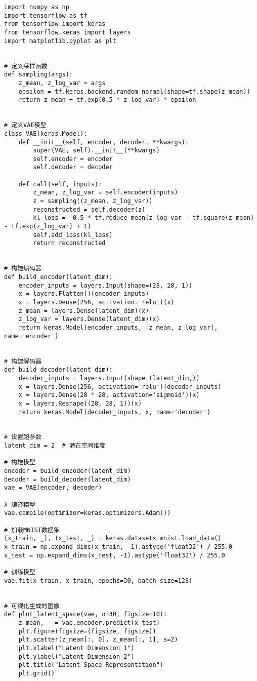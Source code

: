 \begin{lstlisting}
import numpy as np
import tensorflow as tf
from tensorflow import keras
from tensorflow.keras import layers
import matplotlib.pyplot as plt


# 定义采样函数
def sampling(args):
    z_mean, z_log_var = args
    epsilon = tf.keras.backend.random_normal(shape=tf.shape(z_mean))
    return z_mean + tf.exp(0.5 * z_log_var) * epsilon


# 定义VAE模型
class VAE(keras.Model):
    def __init__(self, encoder, decoder, **kwargs):
        super(VAE, self).__init__(**kwargs)
        self.encoder = encoder
        self.decoder = decoder

    def call(self, inputs):
        z_mean, z_log_var = self.encoder(inputs)
        z = sampling((z_mean, z_log_var))
        reconstructed = self.decoder(z)
        kl_loss = -0.5 * tf.reduce_mean(z_log_var - tf.square(z_mean) - tf.exp(z_log_var) + 1)
        self.add_loss(kl_loss)
        return reconstructed


# 构建编码器
def build_encoder(latent_dim):
    encoder_inputs = layers.Input(shape=(28, 28, 1))
    x = layers.Flatten()(encoder_inputs)
    x = layers.Dense(256, activation='relu')(x)
    z_mean = layers.Dense(latent_dim)(x)
    z_log_var = layers.Dense(latent_dim)(x)
    return keras.Model(encoder_inputs, [z_mean, z_log_var], name='encoder')


# 构建解码器
def build_decoder(latent_dim):
    decoder_inputs = layers.Input(shape=(latent_dim,))
    x = layers.Dense(256, activation='relu')(decoder_inputs)
    x = layers.Dense(28 * 28, activation='sigmoid')(x)
    x = layers.Reshape((28, 28, 1))(x)
    return keras.Model(decoder_inputs, x, name='decoder')


# 设置超参数
latent_dim = 2  # 潜在空间维度

# 构建模型
encoder = build_encoder(latent_dim)
decoder = build_decoder(latent_dim)
vae = VAE(encoder, decoder)

# 编译模型
vae.compile(optimizer=keras.optimizers.Adam())

# 加载MNIST数据集
(x_train, _), (x_test, _) = keras.datasets.mnist.load_data()
x_train = np.expand_dims(x_train, -1).astype('float32') / 255.0
x_test = np.expand_dims(x_test, -1).astype('float32') / 255.0

# 训练模型
vae.fit(x_train, x_train, epochs=30, batch_size=128)


# 可视化生成的图像
def plot_latent_space(vae, n=30, figsize=10):
    z_mean, _ = vae.encoder.predict(x_test)
    plt.figure(figsize=(figsize, figsize))
    plt.scatter(z_mean[:, 0], z_mean[:, 1], s=2)
    plt.xlabel("Latent Dimension 1")
    plt.ylabel("Latent Dimension 2")
    plt.title("Latent Space Representation")
    plt.grid()



\end{lstlisting}
